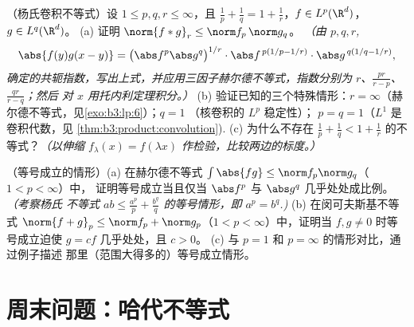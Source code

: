 \begin{exercise}[$\star\star\star$]\label{exo:b3:lp:11}
（杨氏卷积不等式）设 $1 \leq p, q, r \leq
\infty$，且 $\frac1p + \frac1q = 1 + \frac1r$，$f \in
L^p(\R^d)$，$g \in L^q(\R^d)$。
(a) 证明 $\norm{f * g}_r \leq \norm f_p\,\norm g_q$。
\emph{（由 $p, q,
r$,
\[
\abs{f(y)g(x-y)} = \bigl(\abs f^p\abs g^q\bigr)^{1/r}
\cdot\abs f^{\,p(1/p - 1/r)}\cdot\abs g^{\,q(1/q - 1/r)},
\]
确定的共轭指数，写出上式，并应用三因子赫尔德不等式，指数分别为
$r$、$\frac{pr}{r - p}$、$\frac{qr}{r - q}$；然后
对 $x$ 用托内利定理积分。）}
(b) 验证已知的三个特殊情形：$r =
\infty$（赫尔德不等式，见\cref{exo:b3:lp:6}）；$q = 1$
（核卷积的 $L^p$ 稳定性）；
$p = q = 1$（$L^1$ 是卷积代数，见
\cref{thm:b3:product:convolution}).
(c) 为什么不存在 $\frac1p + \frac1q < 1 +
\frac1r$ 的不等式？\emph{（以伸缩 $f_\lambda(x) =
f(\lambda x)$ 作检验，比较两边的标度。）}
\end{exercise}

\begin{exercise}[$\star\star$]\label{exo:b3:lp:12}
（等号成立的情形）(a) 在赫尔德不等式
$\int\abs{fg} \leq \norm f_p\norm g_q$（$1 < p < \infty$）中，
证明等号成立当且仅当 $\abs f^p$ 与 $\abs g^q$
几乎处处成比例。\emph{（考察杨氏
不等式 $ab \leq \frac{a^p}p + \frac{b^q}q$ 的等号情形，即 $a^p
= b^q$.)}
(b) 在闵可夫斯基不等式 $\norm{f + g}_p \leq \norm f_p
+ \norm g_p$（$1 < p < \infty$）中，证明当 $f,
g \neq 0$ 时等号成立迫使 $g = cf$ 几乎处处，且 $c > 0$。
(c) 与 $p = 1$ 和 $p = \infty$ 的情形对比，通过例子描述
那里（范围大得多的）等号成立情形。
\end{exercise}

\section{周末问题：哈代不等式}

